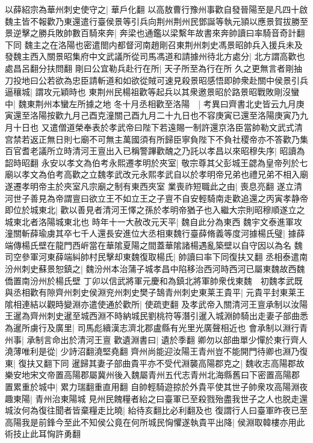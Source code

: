 以薛紹宗為華州刺史使守之|{
	華戶化翻}
以高敖曹行豫州事歡自發晉陽至是凡四十啟魏主皆不報歡乃東還遣行臺侯景等引兵向荆州荆州民鄧誕等執元頴以應景賀拔勝至景逆擊之勝兵敗帥數百騎來奔|{
	奔梁也通鑑以梁繫年故書來奔帥讀曰率騎音奇計翻下同}
魏主之在洛陽也密遣閤内都督河南趙剛召東荆州刺史馮景昭帥兵入援兵未及發魏主西入關景昭集府中文武議所從司馬馮道和請據州待北方處分|{
	北方謂高歡也處昌呂翻分扶問翻}
剛曰公宜勒兵赴行在所|{
	天子所至為行在所}
久之更無言者剛抽刀投地曰公若欲為忠臣請斬道和如欲從賊可速見殺景昭感悟即帥衆赴關中侯景引兵逼穰城|{
	謂攻元穎時也}
東荆州民楊祖歡等起兵以其衆邀景昭於路景昭戰敗剛沒蠻中|{
	魏東荆州本蠻左所據之地}
冬十月丞相歡至洛陽　|{
	考異曰齊書北史皆云九月庚寅還至洛陽按歡九月己酉克潼關己酉九月二十九日也不容庚寅已還至洛陽庚寅乃九月十日也}
又遣僧道榮奉表於孝武帝曰陛下若遠賜一制許還京洛臣當帥勒文武式清宫禁若返正無日則七廟不可無主萬國須有所歸臣寧負陛下不負社稷帝亦不答歡乃集百官耆老議所立時清河王亶出入已稱警蹕歡醜之乃託以孝昌以來昭穆失序|{
	昭讀為韶時昭翻}
永安以孝文為伯考永熙遷孝明於夾室|{
	敬宗尊其父彭城王勰為皇帝列於七廟以孝文為伯考高歡之立魏孝武改元永熙孝武自以於孝明帝兄弟也禮兄弟不相入廟遂遷孝明帝主於夾室凡宗廟之制有東西夾室}
業喪祚短職此之由|{
	喪息亮翻}
遂立清河世子善見為帝謂亶曰欲立王不如立王之子亶不自安輕騎南走歡追還之丙寅孝静帝即位於城東北|{
	歡以善見者清河王懌之孫於孝明帝猶子也入繼大宗則昭穆順遂立之城東北者洛陽城東北也}
時年十一大赦改元天平|{
	魏自此分為東西}
魏宇文泰進軍攻潼關斬薛瑜虜其卒七千人還長安進位大丞相東魏行臺薛脩義等度河據楊氏璧|{
	據薛端傳楊氏壁在龍門西㟁當在華隂夏陽之間蓋華隂諸楊遇亂築壁以自守因以為名}
魏司空參軍河東薛端糾帥村民擊却東魏復取楊氏|{
	帥讀曰率下同復扶又翻}
丞相泰遣南汾州刺史蘇景恕鎮之|{
	魏汾州本治蒲子城孝昌中陷移治西河時西河已屬東魏故西魏僑置南汾州於楊氏壁}
丁卯以信武將軍元慶和為鎮北將軍帥衆伐東魏　初魏孝武既與丞相歡有隙齊州刺史侯淵兖州刺史樊子鵠青州刺史東莱王貴平|{
	元貴平封東莱王}
隂相連結以觀時變淵亦遣使通於歡所|{
	使疏吏翻}
及孝武帝入關清河王亶承制以汝陽王暹為齊州刺史暹至城西淵不時納城民劉桃符等潛引暹入城淵帥騎出走妻子部曲悉為暹所虜行及廣里|{
	司馬彪續漢志濟北郡盧縣有光里光廣聲相近也}
會承制以淵行青州事|{
	承制言命出於清河王亶}
歡遺淵書曰|{
	遺於季翻}
卿勿以部曲單少憚於東行齊人澆薄唯利是從|{
	少詩沼翻澆堅堯翻}
齊州尚能迎汝陽王青州豈不能開門待卿也淵乃復東|{
	復扶又翻下同}
暹歸其妻子部曲貴平亦不受代淵襲高陽郡克之|{
	魏收志高陽郡故樂安地宋文帝置高陽郡屬冀州後入魏屬青州五代志青州北海縣舊曰下密置高陽郡}
置累重於城中|{
	累力瑞翻重直用翻}
自帥輕騎遊掠於外貴平使其世子帥衆攻高陽淵夜趣東陽|{
	青州治東陽城}
見州民餽糧者紿之曰臺軍已至殺戮殆盡我世子之人也脱走還城汝何為復往聞者皆棄糧走比曉|{
	紿待亥翻比必利翻及也}
復謂行人曰臺軍昨夜已至高陽我是前鋒今至此不知侯公竟在何所城民恟懼遂執貴平出降|{
	侯淵取韓樓亦用此術技止此耳恟許勇翻}
